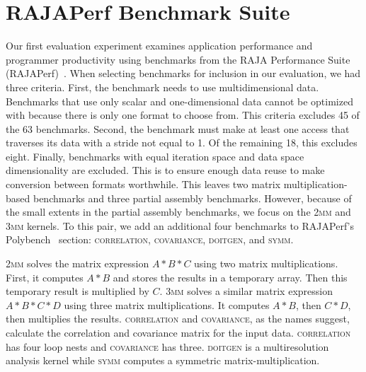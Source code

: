 \section{RAJAPerf Benchmark Suite}
\label{sec:Experiment1}

Our first evaluation experiment examines application performance and programmer productivity using benchmarks from the RAJA Performance Suite (RAJAPerf)~\cite{hornung2017raja}. 
When selecting benchmarks for inclusion in our evaluation, we had three criteria.
First, the benchmark needs to use multidimensional data. 
Benchmarks that use only scalar and one-dimensional data cannot be optimized with \FormatDecisions{} because there is only one format to choose from.
This criteria excludes 45 of the 63 benchmarks.
Second, the benchmark must make at least one access that traverses its data with a stride not equal to 1. 
Of the remaining 18, this excludes eight.
Finally, benchmarks with equal iteration space and data space dimensionality are excluded. 
This is to ensure enough data reuse to make conversion between formats worthwhile.
This leaves two matrix multiplication-based benchmarks and three partial assembly benchmarks.
However, because of the small extents in the partial assembly benchmarks, we focus on the \textsc{2mm} and \textsc{3mm} kernels.
To this pair, we add an additional four benchmarks to RAJAPerf's Polybench~\cite{pouchet2012polybench} section: \textsc{correlation}, \textsc{covariance}, \textsc{doitgen}, and \textsc{symm}. 

\textsc{2mm} solves the matrix expression $A*B*C$ using two matrix multiplications. 
First, it computes $A*B$ and stores the results in a temporary array.
Then this temporary result is multiplied by $C$.
\textsc{3mm} solves a similar matrix expression $A*B*C*D$ using three matrix multiplications.
It computes $A*B$, then $C*D$, then multiplies the results.
\textsc{correlation} and \textsc{covariance}, as the names suggest, calculate the correlation and covariance matrix for the input data. 
\textsc{correlation} has four loop nests and \textsc{covariance} has three.
\textsc{doitgen} is a multiresolution analysis kernel while \textsc{symm} computes a symmetric matrix-multiplication.

